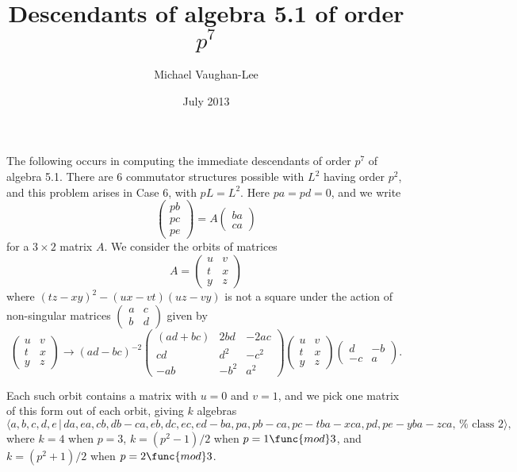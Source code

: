 \documentclass[12pt]{article}
\begin{document}
\title{Descendants of algebra 5.1 of order $p^{7}$}
\author{Michael Vaughan-Lee}
\date{July 2013}
\maketitle

The following occurs in computing the immediate descendants of order $p^{7}$
of algebra 5.1. There are 6 commutator structures possible with $L^{2}$
having order $p^{2}$, and this problem arises in Case 6, with $pL=L^{2}$.
Here $pa=pd=0$, and we write%
\[
\left( 
\begin{array}{l}
pb \\ 
pc \\ 
pe%
\end{array}%
\right) =A\left( 
\begin{array}{l}
ba \\ 
ca%
\end{array}%
\right) 
\]%
for a $3\times 2$ matrix $A$. We consider the orbits of matrices 
\[
A=\left( 
\begin{array}{ll}
u & v \\ 
t & x \\ 
y & z%
\end{array}%
\right) 
\]%
where $(tz-xy)^{2}-(ux-vt)(uz-vy)$ is not a square under the action of
non-singular matrices $\left( 
\begin{array}{ll}
a & c \\ 
b & d%
\end{array}%
\right) $ given by 
\[
\left( 
\begin{array}{ll}
u & v \\ 
t & x \\ 
y & z%
\end{array}%
\right) \rightarrow (ad-bc)^{-2}\left( 
\begin{array}{lll}
(ad+bc) & 2bd & -2ac \\ 
cd & d^{2} & -c^{2} \\ 
-ab & -b^{2} & a^{2}%
\end{array}%
\right) \left( 
\begin{array}{ll}
u & v \\ 
t & x \\ 
y & z%
\end{array}%
\right) \left( 
\begin{array}{ll}
d & -b \\ 
-c & a%
\end{array}%
\right) .
\]

Each such orbit contains a matrix with $u=0$ and $v=1$, and we pick one
matrix of this form out of each orbit, giving $k$ algebras 
\[
\langle
a,b,c,d,e\,|%
\,da,ea,cb,db-ca,eb,dc,ec,ed-ba,pa,pb-ca,pc-tba-xca,pd,pe-yba-zca,\,\text{%
class }2\rangle ,
\]%
where $k=4$ when $p=3$, $k=(p^{2}-1)/2$ when $p=1\func{mod}3$, and $%
k=(p^{2}+1)/2$ when $p=2\func{mod}3$.
\end{document}
